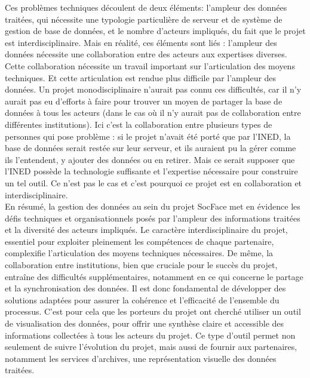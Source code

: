 \begin{enumerate}[label=\alph*)]
Ces problèmes techniques découlent de deux éléments: l’ampleur des données traitées, qui nécessite une typologie particulière de serveur et de système de gestion de base de données, et le nombre d’acteurs impliqués, du fait que le projet est interdisciplinaire. Mais en réalité, ces éléments sont liés : l’ampleur des données nécessite une collaboration entre des acteurs aux expertises diverses. Cette collaboration nécessite un travail important sur l’articulation des moyens techniques. Et cette articulation est rendue plus difficile par l’ampleur des données. Un projet monodisciplinaire n’aurait pas connu ces difficultés, car il n'y aurait pas eu d’efforts à faire pour trouver un moyen de partager la base de données à tous les acteurs (dans le cas où il n’y aurait pas de collaboration entre différentes institutions). Ici c’est la collaboration entre plusieurs types de personnes qui pose problème : si le projet n’avait été porté que par l’INED, la base de données serait restée sur leur serveur, et ils auraient pu la gérer comme ils l’entendent, y ajouter des données ou en retirer. Mais ce serait supposer que l’INED possède la technologie suffisante et l’expertise nécessaire pour construire un tel outil. Ce n’est pas le cas et c’est pourquoi ce projet est en collaboration et interdisciplinaire.\\

En résumé, la gestion des données au sein du projet SocFace met en évidence les défis techniques et organisationnels posés par l'ampleur des informations traitées et la diversité des acteurs impliqués. Le caractère interdisciplinaire du projet, essentiel pour exploiter pleinement les compétences de chaque partenaire, complexifie l'articulation des moyens techniques nécessaires. De même, la collaboration entre institutions, bien que cruciale pour le succès du projet, entraîne des difficultés supplémentaires, notamment en ce qui concerne le partage et la synchronisation des données. Il est donc fondamental de développer des solutions adaptées pour assurer la cohérence et l'efficacité de l'ensemble du processus. C’est pour cela que les porteurs du projet ont cherché utiliser un outil de visualisation des données, pour offrir une synthèse claire et accessible des informations collectées à tous les acteurs du projet. Ce type d'outil permet non seulement de suivre l'évolution du projet, mais aussi de fournir aux partenaires, notamment les services d'archives, une représentation visuelle des données traitées.
\end{enumerate}


